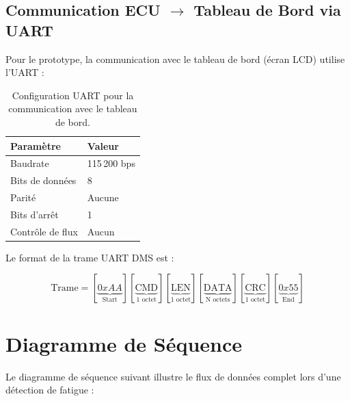 \subsection{Communication ECU $\rightarrow$ Tableau de Bord via UART}

Pour le prototype, la communication avec le tableau de bord (écran LCD) utilise l'UART :

\begin{table}[H]
\centering
\caption{Configuration UART pour la communication avec le tableau de bord.}
\label{tab:uart_config}
\renewcommand{\arraystretch}{1.3}
\begin{tabular}{|l|l|}
\hline
\rowcolor{stellantisblue!15}
\textbf{Paramètre} & \textbf{Valeur} \\
\hline
Baudrate & 115\,200 bps \\
\hline
Bits de données & 8 \\
\hline
Parité & Aucune \\
\hline
Bits d'arrêt & 1 \\
\hline
Contrôle de flux & Aucun \\
\hline
\end{tabular}
\end{table}

Le format de la trame UART DMS est :

\begin{equation}
\text{Trame} = [\underbrace{0xAA}_{\text{Start}}][\underbrace{\text{CMD}}_{\text{1 octet}}][\underbrace{\text{LEN}}_{\text{1 octet}}][\underbrace{\text{DATA}}_{\text{N octets}}][\underbrace{\text{CRC}}_{\text{1 octet}}][\underbrace{0x55}_{\text{End}}]
\label{eq:uart_frame}
\end{equation}

\section{Diagramme de Séquence}

Le diagramme de séquence suivant illustre le flux de données complet lors d'une détection de fatigue :

